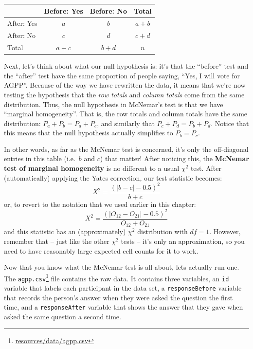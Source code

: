 \documentclass[
  11pt,
  a4paper,
  twoside,symmetric,openright]{book}
\theoremstyle{break}
\theoremstyle{break}
\DeclareRobustCommand{\href}[2]{#2\footnote{\url{#1}}}
\begin{document}
\begin{longtable}[]{@{}lccc@{}}
\toprule\noalign{}
& Before: Yes & Before: No & Total \\
\midrule\noalign{}
\endhead
\bottomrule\noalign{}
\endlastfoot
After: Yes & \(a\) & \(b\) & \(a+b\) \\
After: No & \(c\) & \(d\) & \(c+d\) \\
Total & \(a+c\) & \(b+d\) & \(n\) \\
\end{longtable}

Next, let's think about what our null hypothesis is: it's that the ``before'' test and the ``after'' test have the same proportion of people saying, ``Yes, I will vote for AGPP''. Because of the way we have rewritten the data, it means that we're now testing the hypothesis that the \emph{row totals} and \emph{column totals} come from the same distribution. Thus, the null hypothesis in McNemar's test is that we have ``marginal homogeneity''. That is, the row totals and column totals have the same distribution: \(P_a + P_b = P_a + P_c\), and similarly that \(P_c + P_d = P_b + P_d\). Notice that this means that the null hypothesis actually simplifies to \(P_b = P_c\).

In other words, as far as the McNemar test is concerned, it's only the off-diagonal entries in this table (i.e.~\(b\) and \(c\)) that matter! After noticing this, the \textbf{McNemar test of marginal homogeneity} is no different to a usual \(\chi^2\) test. After (automatically) applying the Yates correction, our test statistic becomes:
\[
X^2 = \frac{(|b-c| - 0.5)^2}{b+c}
\]
or, to revert to the notation that we used earlier in this chapter:
\[
X^2 = \frac{(|O_{12}-O_{21}| - 0.5)^2}{O_{12} + O_{21}}
\]
and this statistic has an (approximately) \(\chi^2\) distribution with \(df=1\). However, remember that -- just like the other \(\chi^2\) tests -- it's only an approximation, so you need to have reasonably large expected cell counts for it to work.

Now that you know what the McNemar test is all about, lets actually run one. The \href{resources/data/agpp.csv}{\texttt{agpp.csv}} file contains the raw data. It contains three variables, an \texttt{id} variable that labels each participant in the data set, a \texttt{responseBefore} variable that records the person's answer when they were asked the question the first time, and a \texttt{responseAfter} variable that shows the answer that they gave when asked the same question a second time.
\end{document}
